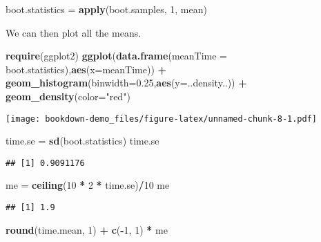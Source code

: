 \documentclass[]{book}
\newenvironment{Shaded}{\begin{snugshade}}{\end{snugshade}}
\newcommand{\DataTypeTok}[1]{\textcolor[rgb]{0.13,0.29,0.53}{#1}}
\newcommand{\DecValTok}[1]{\textcolor[rgb]{0.00,0.00,0.81}{#1}}
\newcommand{\FloatTok}[1]{\textcolor[rgb]{0.00,0.00,0.81}{#1}}
\newcommand{\KeywordTok}[1]{\textcolor[rgb]{0.13,0.29,0.53}{\textbf{#1}}}
\newcommand{\NormalTok}[1]{#1}
\newcommand{\OperatorTok}[1]{\textcolor[rgb]{0.81,0.36,0.00}{\textbf{#1}}}
\newcommand{\StringTok}[1]{\textcolor[rgb]{0.31,0.60,0.02}{#1}}
\begin{document}
\begin{Shaded}
\begin{Highlighting}[]
\NormalTok{boot.statistics =}\StringTok{ }\KeywordTok{apply}\NormalTok{(boot.samples, }\DecValTok{1}\NormalTok{, mean)}
\end{Highlighting}
\end{Shaded}

We can then plot all the means.

\begin{Shaded}
\begin{Highlighting}[]
\KeywordTok{require}\NormalTok{(ggplot2)}
\KeywordTok{ggplot}\NormalTok{(}\KeywordTok{data.frame}\NormalTok{(}\DataTypeTok{meanTime =}\NormalTok{ boot.statistics),}\KeywordTok{aes}\NormalTok{(}\DataTypeTok{x=}\NormalTok{meanTime)) }\OperatorTok{+}
\KeywordTok{geom_histogram}\NormalTok{(}\DataTypeTok{binwidth=}\FloatTok{0.25}\NormalTok{,}\KeywordTok{aes}\NormalTok{(}\DataTypeTok{y=}\NormalTok{..density..)) }\OperatorTok{+}
\KeywordTok{geom_density}\NormalTok{(}\DataTypeTok{color=}\StringTok{"red"}\NormalTok{)}
\end{Highlighting}
\end{Shaded}

\texttt{[image: bookdown-demo\_files/figure-latex/unnamed-chunk-8-1.pdf]}

\begin{Shaded}
\begin{Highlighting}[]
\NormalTok{time.se =}\StringTok{ }\KeywordTok{sd}\NormalTok{(boot.statistics)}
\NormalTok{time.se}
\end{Highlighting}
\end{Shaded}

\begin{verbatim}
## [1] 0.9091176
\end{verbatim}

\begin{Shaded}
\begin{Highlighting}[]
\NormalTok{me =}\StringTok{ }\KeywordTok{ceiling}\NormalTok{(}\DecValTok{10} \OperatorTok{*}\StringTok{ }\DecValTok{2} \OperatorTok{*}\StringTok{ }\NormalTok{time.se)}\OperatorTok{/}\DecValTok{10}
\NormalTok{me}
\end{Highlighting}
\end{Shaded}

\begin{verbatim}
## [1] 1.9
\end{verbatim}

\begin{Shaded}
\begin{Highlighting}[]
\KeywordTok{round}\NormalTok{(time.mean, }\DecValTok{1}\NormalTok{) }\OperatorTok{+}\StringTok{ }\KeywordTok{c}\NormalTok{(}\OperatorTok{-}\DecValTok{1}\NormalTok{, }\DecValTok{1}\NormalTok{) }\OperatorTok{*}\StringTok{ }\NormalTok{me}
\end{Highlighting}
\end{Shaded}
\end{document}
